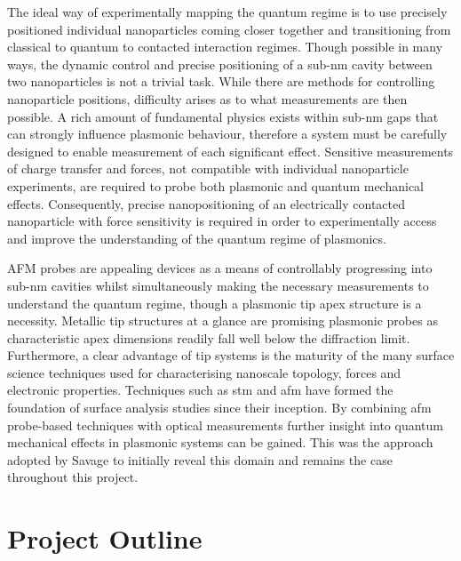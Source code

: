 \documentclass[12pt, a4paper, twoside]{book}
\begin{document}
The ideal way of experimentally mapping the quantum regime is to use precisely positioned individual nanoparticles coming closer together and transitioning from classical to quantum to contacted interaction regimes. Though possible in many ways, the dynamic control and precise positioning of a sub-nm cavity between two nanoparticles is not a trivial task. While there are methods for controlling nanoparticle positions, difficulty arises as to what measurements are then possible. A rich amount of fundamental physics exists within sub-nm gaps that can strongly influence plasmonic behaviour, therefore a system must be carefully designed to enable measurement of each significant effect. Sensitive measurements of charge transfer and forces, not compatible with individual nanoparticle experiments, are required to probe both plasmonic and quantum mechanical effects. Consequently, precise nanopositioning of an electrically contacted nanoparticle with force sensitivity is required in order to experimentally access and improve the understanding of the quantum regime of plasmonics.

AFM probes are appealing devices as a means of controllably progressing into sub-nm cavities whilst simultaneously making the necessary measurements to understand the quantum regime, though a plasmonic tip apex structure is a necessity. Metallic tip structures at a glance are promising plasmonic probes as  characteristic apex dimensions readily fall well below the diffraction limit. Furthermore, a clear advantage of tip systems is the maturity of the many surface science techniques used for characterising nanoscale topology, forces and electronic properties. Techniques such as \gls{stm} \cite{binnig1982} and \gls{afm} \cite{binnig1986} have formed the foundation of surface analysis studies since their inception. By combining \gls{afm} probe-based techniques with optical measurements further insight into quantum mechanical effects in plasmonic systems can be gained. This was the approach adopted by Savage  to initially reveal this domain \cite{savage2012} and remains the case throughout this project.

\section{Project Outline}
\end{document}
